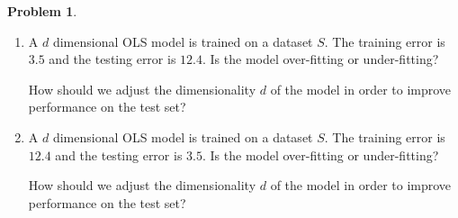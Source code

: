 \documentclass[10pt]{article}
\theoremstyle{definition}
\newtheorem{problem}{Problem}
\begin{document}
\begin{problem}
\begin{enumerate}
        \newpage
        \item A $d$ dimensional OLS model is trained on a dataset $S$.
            The training error is $3.5$ and the testing error is $12.4$.
            Is the model over-fitting or under-fitting?
            \vspace{0.5in}

            How should we adjust the dimensionality $d$ of the model in order to improve performance on the test set?
            \vspace{3.5in}

        \item A $d$ dimensional OLS model is trained on a dataset $S$.
            The training error is $12.4$ and the testing error is $3.5$.
            Is the model over-fitting or under-fitting?
            \vspace{0.5in}

            How should we adjust the dimensionality $d$ of the model in order to improve performance on the test set?
            \vspace{3.5in}


    \end{enumerate}
\end{problem}

\end{document}
